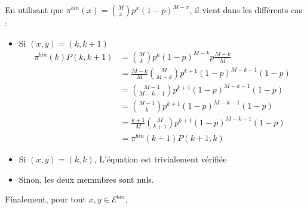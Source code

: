 \documentclass[a4paper,11pt]{article}
\def \E{\mathcal{E}}
\begin{document}
\begin{itemize}
En utilisant que $\pi^{bin}(x)  = \binom{M}{x}p^x(1-p)^{M-x}$, il vient dans les différents cas :

	\begin{itemize}
		\item 	Si $(x,y) = (k,k+1)$
			\begin{equation}	
			\begin{split}
			\pi^{bin}(k)P(k,k+1) &= \binom{M}{k}p^k(1-p)^{M-k}p\frac{M-k}{M} \\
			&= \frac{M-k}{M}\binom{M}{M-k}p^{k+1}(1-p)^{M-k-1}(1-p)\\
			&= \binom{M-1}{M-k-1}p^{k+1}(1-p)^{M-k-1}(1-p)\\
			&= \binom{M-1}{k}p^{k+1}(1-p)^{M-k-1}(1-p)\\
			&= \frac{k+1}{M}\binom{M}{k+1}p^{k+1}(1-p)^{M-k-1}(1-p)\\
			&= \pi^{bin}(k+1)P(k+1,k) 
			\end{split}
			\end{equation}
		\item   Si $(x,y) = (k,k)$, L'équation est trivialement vérifiée
		\item   Sinon, les deux memmbres sont nuls.
	\end{itemize}
		Finalement, pour tout $x,y \in \E^{bin}$, 
\begin{center}
\end{center}

\end{itemize}
\end{document}
